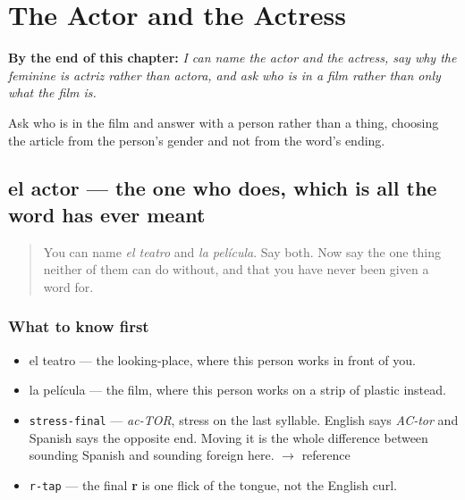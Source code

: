 
\chapter{The Actor and the Actress}
\label{ch:actor-actriz}

\begin{chapteropening}
\textbf{By the end of this chapter:} \emph{I can name the actor and the actress, say why the feminine is actriz rather than actora, and ask who is in a film rather than only what the film is.}

Ask who is in the film and answer with a person rather than a thing, choosing the article from the person's gender and not from the word's ending.
\end{chapteropening}

\section[el actor]{el actor — the one who does, which is all the word has ever meant}

\label{lesson:ES-C421-actor}



\begin{quote}
You can name \emph{el teatro} and \emph{la película}. Say both. Now say the one thing neither of them can do without, and that you have never been given a word for.
\end{quote}

\subsection*{What to know first}
\begin{itemize}
\raggedright
  \item el teatro — the looking-place, where this person works in front of you.
  \item la película — the film, where this person works on a strip of plastic instead.
\end{itemize}

\begin{sounds}
\begin{itemize}
\raggedright
  \item \texttt{stress-final} — \emph{ac-TOR}, stress on the last syllable. English says \emph{AC-tor} and Spanish says the opposite end. Moving it is the whole difference between sounding Spanish and sounding foreign here. $\to$ reference
  \item \texttt{r-tap} — the final \textbf{r} is one flick of the tongue, not the English curl.
\end{itemize}
\end{sounds}

